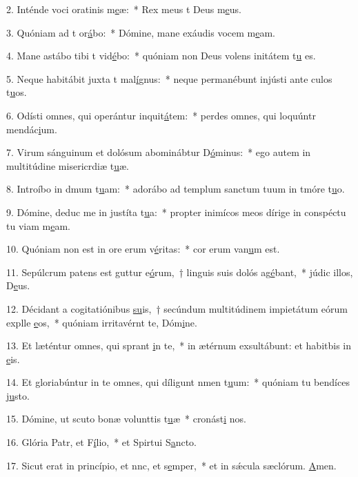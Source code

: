 2. Inténde voci oratinis m\uline{e}æ:~* Rex meus t Deus m\uline{e}us.\par 
3. Quóniam ad t or\uline{á}bo:~* Dómine, mane exáudis vocem m\uline{e}am.\par 
4. Mane astábo tibi t vid\uline{é}bo:~* quóniam non Deus volens initátem t\uline{u} es.\par 
5. Neque habitábit juxta t mal\uline{í}gnus:~* neque permanébunt injústi ante culos t\uline{u}os.\par 
6. Odísti omnes, qui operántur inquit\uline{á}tem:~* perdes omnes, qui loquúntr mendác\uline{i}um.\par 
7. Virum sánguinum et dolósum abominábtur D\uline{ó}minus:~* ego autem in multitúdine misericrdiæ t\uline{u}æ.\par 
8. Introíbo in dmum t\uline{u}am:~* adorábo ad templum sanctum tuum in tmóre t\uline{u}o.\par 
9. Dómine, deduc me in justíta t\uline{u}a:~* propter inimícos meos dírige in conspéctu tu viam m\uline{e}am.\par 
10. Quóniam non est in ore erum v\uline{é}ritas:~* cor erum van\uline{u}m est.\par 
11. Sepúlcrum patens est guttur e\uline{ó}rum,~† linguis suis dolós ag\uline{é}bant,~* júdic illos, D\uline{e}us.\par 
12. Décidant a cogitatiónibus \uline{su}is,~† secúndum multitúdinem impietátum eórum explle \uline{e}os,~* quóniam irritavérnt te, Dóm\uline{i}ne.\par 
13. Et læténtur omnes, qui sprant \uline{i}n te,~* in ætérnum exsultábunt: et habitbis in \uline{e}is.\par 
14. Et gloriabúntur in te omnes, qui díligunt nmen t\uline{u}um:~* quóniam tu bendíces j\uline{u}sto.\par 
15. Dómine, ut scuto bonæ volunttis t\uline{u}æ~* cronást\uline{i} nos.\par 
16. Glória Patr, et F\uline{í}lio,~* et Spirtui S\uline{a}ncto.\par 
17. Sicut erat in princípio, et nnc, et s\uline{e}mper,~* et in sǽcula sæclórum. \uline{A}men.\par 
